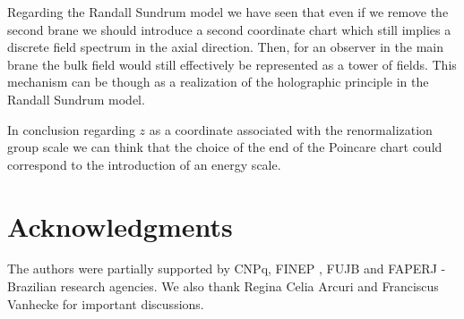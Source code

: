 \documentclass[a4paper,12pt]{article}
\begin{document}
Regarding the Randall Sundrum model we have seen that even if 
we remove the second brane we should introduce a second coordinate chart
which still implies a discrete field spectrum 
in the axial direction.
Then, for an observer in the main brane the bulk field would still 
effectively be represented as  a tower of fields. 
This mechanism can be though as a realization of the holographic
principle in the Randall Sundrum model.

In conclusion regarding $z$ as a coordinate associated with the 
renormalization group scale\cite{Ver,Ran} we can think that
the choice of the end of the Poincare chart could correspond to
the introduction of an energy scale.
 



 

\section*{Acknowledgments} 
The authors were partially supported by CNPq, FINEP , FUJB and FAPERJ
- Brazilian research agencies. We also thank  Regina Celia Arcuri
and Franciscus Vanhecke for important discussions.

  

\end{document}
